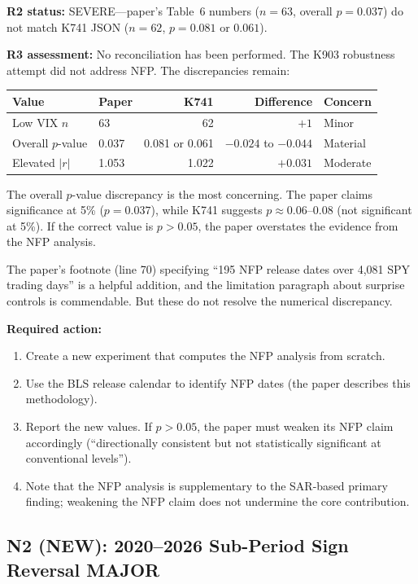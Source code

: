 \documentclass[12pt,a4paper]{article}
\begin{document}
\textbf{R2 status:} SEVERE---paper's Table~6 numbers ($n = 63$, overall $p = 0.037$) do not match K741 JSON ($n = 62$, $p = 0.081$ or $0.061$).

\textbf{R3 assessment:} No reconciliation has been performed. The K903 robustness attempt did not address NFP. The discrepancies remain:

\medskip
\begin{tabular}{llrrl}
\toprule
\textbf{Value} & \textbf{Paper} & \textbf{K741} & \textbf{Difference} & \textbf{Concern} \\
\midrule
Low VIX $n$ & 63 & 62 & $+1$ & Minor \\
Overall $p$-value & 0.037 & 0.081 or 0.061 & $-0.024$ to $-0.044$ & \textcolor{errorred}{Material} \\
Elevated $|r|$ & 1.053 & 1.022 & $+0.031$ & Moderate \\
\bottomrule
\end{tabular}

\medskip

The overall $p$-value discrepancy is the most concerning. The paper claims significance at 5\% ($p = 0.037$), while K741 suggests $p \approx 0.06$--$0.08$ (not significant at 5\%). If the correct value is $p > 0.05$, the paper overstates the evidence from the NFP analysis.

The paper's footnote (line 70) specifying ``195 NFP release dates over 4,081 SPY trading days'' is a helpful addition, and the limitation paragraph about surprise controls is commendable. But these do not resolve the numerical discrepancy.

\textbf{Required action:}
\begin{enumerate}[nosep]
\item Create a new experiment that computes the NFP analysis from scratch.
\item Use the BLS release calendar to identify NFP dates (the paper describes this methodology).
\item Report the new values. If $p > 0.05$, the paper must weaken its NFP claim accordingly (``directionally consistent but not statistically significant at conventional levels'').
\item Note that the NFP analysis is supplementary to the SAR-based primary finding; weakening the NFP claim does not undermine the core contribution.
\end{enumerate}


\subsection*{N2 (NEW): 2020--2026 Sub-Period Sign Reversal \hfill \textcolor{errorred}{MAJOR}}
\end{document}
